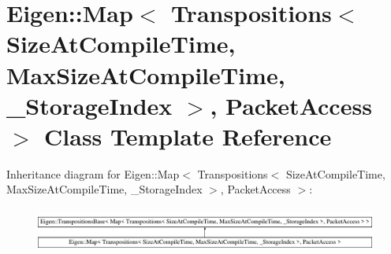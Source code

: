 \hypertarget{class_eigen_1_1_map_3_01_transpositions_3_01_size_at_compile_time_00_01_max_size_at_compile_timecc993082d7c0ba51ca94b27e97da8dd3}{}\section{Eigen\+::Map$<$ Transpositions$<$ Size\+At\+Compile\+Time, Max\+Size\+At\+Compile\+Time, \+\_\+\+Storage\+Index $>$, Packet\+Access $>$ Class Template Reference}
\label{class_eigen_1_1_map_3_01_transpositions_3_01_size_at_compile_time_00_01_max_size_at_compile_timecc993082d7c0ba51ca94b27e97da8dd3}
Inheritance diagram for Eigen\+::Map$<$ Transpositions$<$ Size\+At\+Compile\+Time, Max\+Size\+At\+Compile\+Time, \+\_\+\+Storage\+Index $>$, Packet\+Access $>$\+:\begin{figure}[H]
\begin{center}
\leavevmode
\includegraphics[height=1.452659cm]{class_eigen_1_1_map_3_01_transpositions_3_01_size_at_compile_time_00_01_max_size_at_compile_timecc993082d7c0ba51ca94b27e97da8dd3}
\end{center}
\end{figure}
